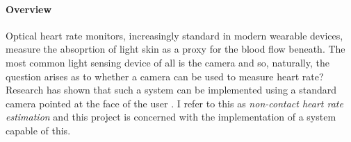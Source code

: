 \paragraph{Overview}
Optical heart rate monitors, increasingly standard in modern wearable devices, measure the absoprtion of light
skin as a proxy for the blood flow beneath.
The most common light sensing device of all is the camera and so, naturally, the question arises as to whether a camera can be used to measure heart rate?
Research has shown that such a system can be implemented using a standard camera pointed at the face of the user \cite{poh2010non}\cite{vanderKooij2019}\cite{Verkruysse2008}. I refer to this as \textit{non-contact heart rate estimation} and this project is concerned with the implementation of a system capable of this.  

